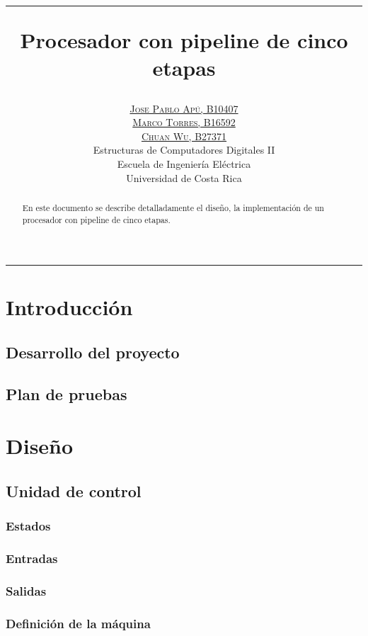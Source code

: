 \documentclass[paper=letter, fontsize=12pt]{article}
\title{\vspace{-20mm}\hrule\vspace{5mm}\fontsize{24pt}{10pt}\selectfont\textbf{Procesador con pipeline de cinco etapas}} %
\author{
\large
\href{mailto:josepabloapu@gmail.com}{\textsc{Jose Pablo Apú, B10407}}\\\href{mailto:marco.torres.810@gmail.com}{\textsc{Marco Torres, B16592}}\\\href{mailto:}{\textsc{Chuan Wu, B27371}} \\[2mm]
\normalsize Estructuras de Computadores Digitales II \\[1mm] %
\normalsize Escuela de Ingeniería Eléctrica \\ %
\normalsize Universidad de Costa Rica \\ %
}
\date{}
\begin{document}
\maketitle 
\hrule
\begin{abstract}
En este documento se describe detalladamente el diseño, la implementación de un procesador con pipeline de cinco etapas.   
\end{abstract}

\section{Introducción}

\subsection{Desarrollo del proyecto}

\subsection{Plan de pruebas}

\section{Diseño}

\subsection{Unidad de control}

\subsubsection{Estados}

\subsubsection{Entradas}

\subsubsection{Salidas}

\subsubsection{Definición de la máquina}
\end{document}
